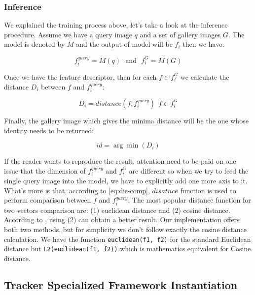 \subsubsection{Inference}
\label{fw-recognizer-spec-inference}

We explained the training process above, let's take a look at the inference
procedure. Assume we have a query image $q$ and a set of gallery images $G$.
The model is denoted by $M$ and the output of model will be $f_i$ then we have:

$$
f_i^{query} = M(q) \:\:\: \text{and} \:\:\: f_i^{G} = M(G)
$$

Once we have the feature descriptor, then for each $f \in f_i^G$  we calculate
the distance $D_i$ between $f$ and $f_i^{query}$:

\begin{equation}
\label{eq:dis-comp}
D_i =  distance(f, f_i^{query}) \:\: f \in f_i^G
\end{equation}

Finally, the gallery image which gives the minima distance will be the one
whose identity needs to be returned:

$$
id = \arg \min(D_i)
$$

If the reader wants to reproduce the result, attention need to be paid on one issue
that the dimension of $f_i^{query}$ and $f_i^G$ are different so when we try
to feed the single query image into the model, we have to explicitly add one
more axis to it.
What's more is that, according to \autoref{eq:dis-comp},  $disatnce$ function is
used to perform comparison between $f$ and $f_i^{query}$. The most popular
distance function for two vectors comparison are: (1) euclidean distance and (2)
cosine distance. According to \cite{tricks-and-baseline-for-reid-2019}, using
(2) can obtain a better result. Our implementation offers both two
methods, but for simplicity we don't follow exactly the cosine distance
calculation. We have the function \texttt{euclidean(f1, f2)} for the standard
Euclidean distance but \texttt{L2(euclidean(f1, f2))} which is
mathematics equivalent for Cosine distance.

\subsection{Tracker Specialized Framework Instantiation}
\label{sec:fw-inst-tracker}

